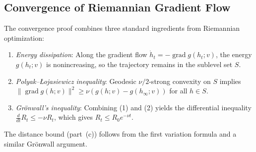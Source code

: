 \documentclass[twoside,11pt]{article}
\newcommand{\rev}[1]{#1}                           %
\newcommand{\grad}{\operatorname{grad} }
\begin{document}
\subsection{Convergence of Riemannian Gradient Flow}
\rev{%
The convergence proof combines three standard ingredients from Riemannian optimization:
\begin{enumerate}[leftmargin=*,nosep]
\item \emph{Energy dissipation}: Along the gradient flow $\dot h_t = -\grad g(h_t;v)$,
the energy $g(h_t;v)$ is nonincreasing, so the trajectory remains in the sublevel set $S$.
\item \emph{Polyak--\L{}ojasiewicz inequality}: Geodesic $\nu/2$-strong convexity on $S$ implies
$\|\grad g(h;v)\|^2 \ge \nu(g(h;v) - g(h_\infty;v))$ for all $h \in S$.
\item \emph{Gr\"onwall's inequality}: Combining (1) and (2) yields the differential inequality
$\frac{d}{dt}R_t \le -\nu R_t$, which gives $R_t \le R_0 e^{-\nu t}$.
\end{enumerate}
The distance bound (part~(c)) follows from the first variation formula and a similar Gr\"onwall argument.
}
\end{document}
